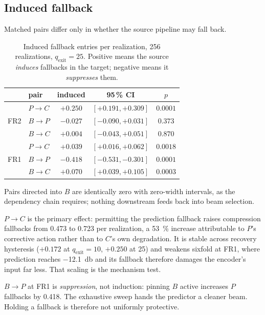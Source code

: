 \subsection{Induced fallback}

Matched pairs differ only in whether the source pipeline may fall back.

\begin{table}[t]
\caption{Induced fallback entries per realization, 256 realizations,
$q_{\text{exit}}{=}25$. Positive means the source \emph{induces} fallbacks
in the target; negative means it \emph{suppresses} them.}
\label{tab:induced}
\centering
\begin{tabular}{llccc}
\toprule
 & pair & induced & 95\,\% CI & $p$ \\
\midrule
\multirow{3}{*}{FR2}
 & $P\!\to\!C$ & $+0.250$ & $[+0.191,+0.309]$ & $0.0001$ \\
 & $B\!\to\!P$ & $-0.027$ & $[-0.090,+0.031]$ & $0.373$ \\
 & $B\!\to\!C$ & $+0.004$ & $[-0.043,+0.051]$ & $0.870$ \\
\midrule
\multirow{3}{*}{FR1}
 & $P\!\to\!C$ & $+0.039$ & $[+0.016,+0.062]$ & $0.0018$ \\
 & $B\!\to\!P$ & $-0.418$ & $[-0.531,-0.301]$ & $0.0001$ \\
 & $B\!\to\!C$ & $+0.070$ & $[+0.039,+0.105]$ & $0.0003$ \\
\bottomrule
\end{tabular}
\end{table}

Pairs directed into $B$ are identically zero with zero-width intervals, as
the dependency chain requires; nothing downstream feeds back into beam
selection.

$P\!\to\!C$ is the primary effect: permitting the prediction fallback
raises compression fallbacks from 0.473 to 0.723 per realization, a
\SI{53}{\percent} increase attributable to $P$'s corrective action rather
than to $C$'s own degradation. It is stable across recovery hysteresis
($+0.172$ at $q_{\text{exit}}{=}10$, $+0.250$ at 25) and weakens sixfold at
FR1, where prediction reaches \SI{-12.1}{\decibel} and its fallback
therefore damages the encoder's input far less. That scaling is the
mechanism test.

$B\!\to\!P$ at FR1 is \emph{suppression}, not induction: pinning $B$ active
increases $P$ fallbacks by 0.418. The exhaustive sweep hands the predictor
a cleaner beam. Holding a fallback is therefore not uniformly protective.

